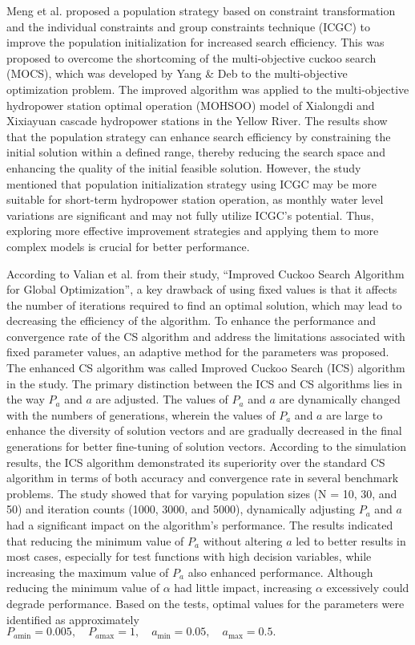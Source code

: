 \documentclass{article}
\begin{document}
Meng et al. \cite{meng2019multi} proposed a population strategy based on constraint transformation and the individual constraints and group constraints technique (ICGC) to improve the population initialization for increased search efficiency. This was proposed to overcome the shortcoming of the multi-objective cuckoo search (MOCS), which was developed by Yang \& Deb \cite{yang2013multiobjective} to the multi-objective optimization problem. The improved algorithm was applied to the multi-objective hydropower station optimal operation (MOHSOO) model of Xialongdi and Xixiayuan cascade hydropower stations in the Yellow River. The results show that the population strategy can enhance search efficiency by constraining the initial solution within a defined range, thereby reducing the search space and enhancing the quality of the initial feasible solution. However, the study mentioned that population initialization strategy using ICGC may be more suitable for short-term hydropower station operation, as monthly water level variations are significant and may not fully utilize ICGC's potential. Thus, exploring more effective improvement strategies and applying them to more complex models is crucial for better performance.

According to Valian et al. \cite{valian2011improved} from their study, “Improved Cuckoo Search Algorithm for Global Optimization”, a key drawback of using fixed values is that it affects the number of iterations required to find an optimal solution, which may lead to decreasing the efficiency of the algorithm. To enhance the performance and convergence rate of the CS algorithm and address the limitations associated with fixed parameter values, an adaptive method for the parameters was proposed. The enhanced CS algorithm was called Improved Cuckoo Search (ICS) algorithm in the study. The primary distinction between the ICS and CS algorithms lies in the way $P_a$ and $a$ are adjusted. The values of $P_a$ and $a$ are dynamically changed with the numbers of generations, wherein the values of $P_a$ and $a$ are large to enhance the diversity of solution vectors and are gradually decreased in the final generations for better fine-tuning of solution vectors. According to the simulation results, the ICS algorithm demonstrated its superiority over the standard CS algorithm in terms of both accuracy and convergence rate in several benchmark problems. The study showed that for varying population sizes (N = 10, 30, and 50) and iteration counts (1000, 3000, and 5000), dynamically adjusting $P_a$ and $a$ had a significant impact on the algorithm's performance. The results indicated that reducing the minimum value of $P_a$ without altering $a$ led to better results in most cases, especially for test functions with high decision variables, while increasing the maximum value of $P_a$ also enhanced performance. Although reducing the minimum value of $\alpha$ had little impact, increasing $\alpha$ excessively could degrade performance. Based on the tests, optimal values for the parameters were identified as approximately  
$P_{a\text{min}} = 0.005, \quad P_{a\text{max}} = 1, \quad a_{\text{min}} = 0.05, \quad a_{\text{max}} = 0.5.$
\end{document}
